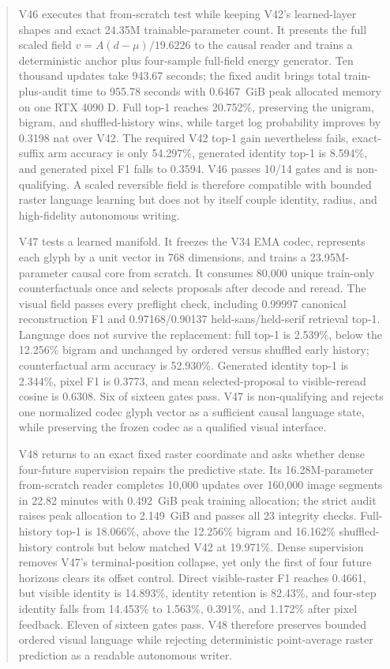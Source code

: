 \documentclass[11pt]{article}
\begin{document}
\begin{abstract}
V46 executes that from-scratch test while keeping V42's learned-layer shapes
and exact 24.35M trainable-parameter count. It presents the full scaled field $v=A(d-\mu)/19.6226$ to the
causal reader and trains a deterministic anchor plus four-sample full-field
energy generator. Ten thousand updates take 943.67 seconds; the fixed audit
brings total train-plus-audit time to 955.78 seconds with 0.6467~GiB peak
allocated memory on one RTX 4090 D. Full top-1 reaches 20.752\%, preserving
the unigram, bigram, and shuffled-history wins, while target log probability
improves by 0.3198 nat over V42. The required V42 top-1 gain nevertheless
fails, exact-suffix arm accuracy is only 54.297\%, generated identity top-1
is 8.594\%, and generated pixel F1 falls to 0.3594. V46 passes 10/14 gates and
is non-qualifying. A scaled reversible field is therefore compatible with
bounded raster language learning but does not by itself couple identity,
radius, and high-fidelity autonomous writing.

V47 tests a learned manifold. It freezes the V34 EMA codec, represents each
glyph by a unit vector in 768 dimensions, and trains a 23.95M-parameter causal
core from scratch. It consumes 80,000 unique train-only counterfactuals once
and selects proposals after decode and reread. The visual field passes every
preflight check, including 0.99997 canonical reconstruction F1 and
0.97168/0.90137 held-sans/held-serif retrieval top-1. Language does not survive
the replacement: full top-1 is 2.539\%, below the 12.256\% bigram and unchanged
by ordered versus shuffled early history; counterfactual arm accuracy is
52.930\%. Generated identity top-1 is 2.344\%, pixel F1 is 0.3773, and mean
selected-proposal to visible-reread cosine is 0.6308. Six of sixteen gates pass.
V47 is non-qualifying and rejects one normalized codec glyph vector as a
sufficient causal language state, while preserving the frozen codec as a
qualified visual interface.

V48 returns to an exact fixed raster coordinate and asks whether dense
four-future supervision repairs the predictive state. Its 16.28M-parameter
from-scratch reader completes 10,000 updates over 160,000 image segments in
22.82 minutes with 0.492~GiB peak training allocation; the strict audit raises
peak allocation to 2.149~GiB and passes all 23 integrity checks. Full-history
top-1 is 18.066\%, above the 12.256\% bigram and 16.162\% shuffled-history
controls but below matched V42 at 19.971\%. Dense supervision removes V47's
terminal-position collapse, yet only the first of four future horizons clears
its offset control. Direct visible-raster F1 reaches 0.4661, but visible
identity is 14.893\%, identity retention is 82.43\%, and four-step identity
falls from 14.453\% to 1.563\%, 0.391\%, and 1.172\% after pixel feedback.
Eleven of sixteen gates pass. V48 therefore preserves bounded ordered visual
language while rejecting deterministic point-average raster prediction as a
readable autonomous writer.
\end{abstract}
\end{document}
